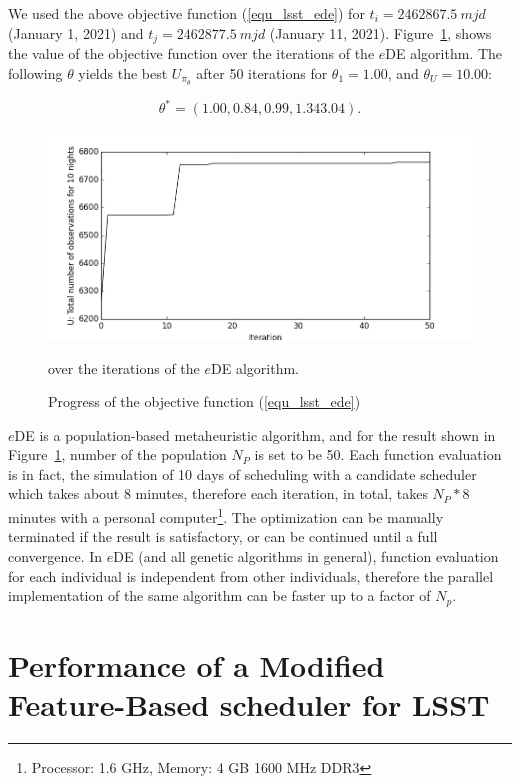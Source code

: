 \documentclass[12pt]{aastex62}
\theoremstyle{definition}
\begin{document}
We used the above objective function (\ref{equ_lsst_ede}) for $t_i = 2462867.5~mjd$ (January 1, 2021) and $t_j = 2462877.5~mjd$ (January 11, 2021). Figure~\ref{fig_eDEObjectiveFunction}, shows the value of the objective function over the iterations of the $e$DE algorithm. The following $\theta$ yields the best $U_{\pi_{\theta}}$ after 50 iterations for $\theta_1 = 1.00$, and $\theta_U = 10.00$:

\begin{equation}
\theta^* = (1.00, 0.84, 0.99,  1.34  3.04).
\end{equation}



\begin{figure}[h!]
\begin{center}
\includegraphics[width=0.5\linewidth]{Figures/eDEObjectiveFunction.png}
\caption{Progress of the objective function (\ref{equ_lsst_ede})} over the iterations of the $e$DE algorithm.
\label{fig_eDEObjectiveFunction}
\end{center}
\end{figure}

$e$DE is a population-based metaheuristic algorithm, and for the result shown in Figure~\ref{fig_eDEObjectiveFunction}, number of the population $N_P$ is set to be 50. Each function evaluation is in fact, the simulation of 10 days of scheduling with a candidate scheduler which takes about 8 minutes, therefore each iteration, in total, takes $N_P * 8$ minutes with a personal computer\footnote{Processor: 1.6 GHz, Memory: 4 GB 1600 MHz DDR3}. The optimization can be manually terminated if the result is satisfactory, or can be continued until a full convergence. In $e$DE (and all genetic algorithms in general), function evaluation for each individual is independent from other individuals, therefore the parallel implementation of the same algorithm can be faster up to a factor of $N_p$. 

 


\section{Performance of a Modified Feature-Based scheduler for LSST}\label{sec_comp}
\end{document}

